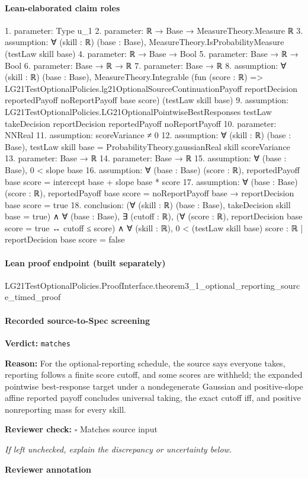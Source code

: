 \documentclass[10pt]{article}
\newcommand{\reviewerbox}{%
  \par\noindent\fbox{\parbox{0.96\linewidth}{\rule{0pt}{0.38in}}}\par
}
\newcommand{\reviewmatch}[1]{%
  \par\noindent\textbf{Reviewer check:} $\square$\; #1\par
  \noindent\emph{If left unchecked, explain the discrepancy or uncertainty below.}\par
}
\begin{document}
\paragraph{Lean-elaborated claim roles}\begin{ReviewVerbatim}
1. parameter: Type u_1
2. parameter: ℝ → Base → MeasureTheory.Measure ℝ
3. assumption: ∀ (skill : ℝ) (base : Base), MeasureTheory.IsProbabilityMeasure (testLaw skill base)
4. parameter: ℝ → Base → Bool
5. parameter: Base → ℝ → Bool
6. parameter: Base → ℝ → ℝ
7. parameter: Base → ℝ
8. assumption: ∀ (skill : ℝ) (base : Base),
  MeasureTheory.Integrable
    (fun (score : ℝ) =>
      LG21TestOptionalPolicies.lg21OptionalSourceContinuationPayoff reportDecision reportedPayoff noReportPayoff base
        score)
    (testLaw skill base)
9. assumption: LG21TestOptionalPolicies.LG21OptionalPointwiseBestResponses testLaw takeDecision reportDecision reportedPayoff
  noReportPayoff
10. parameter: NNReal
11. assumption: scoreVariance ≠ 0
12. assumption: ∀ (skill : ℝ) (base : Base), testLaw skill base = ProbabilityTheory.gaussianReal skill scoreVariance
13. parameter: Base → ℝ
14. parameter: Base → ℝ
15. assumption: ∀ (base : Base), 0 < slope base
16. assumption: ∀ (base : Base) (score : ℝ), reportedPayoff base score = intercept base + slope base * score
17. assumption: ∀ (base : Base) (score : ℝ), reportedPayoff base score = noReportPayoff base → reportDecision base score = true
18. conclusion: (∀ (skill : ℝ) (base : Base), takeDecision skill base = true) ∧
  ∀ (base : Base),
    ∃ (cutoff : ℝ),
      (∀ (score : ℝ), reportDecision base score = true ↔ cutoff ≤ score) ∧
        ∀ (skill : ℝ), 0 < (testLaw skill base) {score : ℝ | reportDecision base score = false}
\end{ReviewVerbatim}

\paragraph{Lean proof endpoint (built separately)}\begin{ReviewVerbatim}
LG21TestOptionalPolicies.ProofInterface.theorem3_1_optional_reporting_source_timed_proof
\end{ReviewVerbatim}

\paragraph{Recorded source-to-Spec screening}
\textbf{Verdict:} \texttt{matches}
\\
{\raggedright
\textbf{Reason:} For the optional-\allowbreak{}reporting schedule, the source says everyone takes, reporting follows a finite score cutoff, and some scores are withheld;\allowbreak{} the expanded pointwise best-\allowbreak{}response target under a nondegenerate Gaussian and positive-\allowbreak{}slope affine reported payoff concludes universal taking, the exact cutoff iff, and positive nonreporting mass for every skill.\allowbreak{}
\par}
\reviewmatch{Matches source input}
\noindent\textbf{Reviewer annotation}\par
\reviewerbox
\clearpage
\hypertarget{source-claim-017682a01e0507bb}{}
\end{document}
